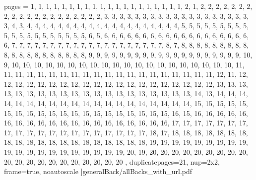 \documentclass[letterpaper]{article}
\begin{document}

	pages = 	{ %
											1,	1,	1,	1,	1,	1,	1,	1,	1,	1,	1,	1,	1,	1,	1,	1,	1,	1,	1,	1,
											2,	1,	
											2,	2,	2,	2,	2,	2,	2,	2,	2,	2,	2,	2,	2,	2,	2,	2,	2,	2,	2,	2,
											3,	3,	3,	3,	3,	3,	3,	3,	3,	3,	3,	3,	3,	3,	3,	3,	3,	3,	3,	3,
											4,	3,	
											4,	4,	4,	4,	4,	4,	4,	4,	4,	4,	4,	4,	4,	4,	4,	4,	4,	4,	4,	4,
											5,	5,	5,	5,	5,	5,	5,	5,	5,	5,	5,	5,	5,	5,	5,	5,	5,	5,	5,	5,
											6,	5,
											6,	6,	6,	6,	6,	6,	6,	6,	6,	6,	6,	6,	6,	6,	6,	6,	6,	6,	6,	6,
											7,	7,	7,	7,	7,	7,	7,	7,	7,	7,	7,	7,	7,	7,	7,	7,	7,	7,	7,	7,
											8,	7,	
											8,	8,	8,	8,	8,	8,	8,	8,	8,	8,	8,	8,	8,	8,	8,	8,	8,	8,	8,	8,
											9,	9,	9,	9,	9,	9,	9,	9,	9,	9,	9,	9,	9,	9,	9,	9,	9,	9,	9,	9,
											10, 9,
											10,	10,	10,	10,	10,	10,	10,	10,	10,	10,	10,	10,	10,	10,	10,	10,	10,	10,	10,	10,
											11,	11,	11,	11,	11,	11,	11,	11,	11,	11,	11,	11,	11,	11,	11,	11,	11,	11,	11,	11,
											12,	11,
											12,	12,	12,	12,	12,	12,	12,	12,	12,	12,	12,	12,	12,	12,	12,	12,	12,	12,	12,	12,
											13,	13,	13,	13,	13,	13,	13,	13,	13,	13,	13,	13,	13,	13,	13,	13,	13,	13,	13,	13,
											14, 	13,
											14,	14,	14,	14,	14,	14,	14,	14,	14,	14,	14,	14,	14,	14,	14,	14,	14,	14,	14,	14,
											15,	15,	15,	15,	15,	15,	15,	15,	15,	15,	15,	15,	15,	15,	15,	15,	15,	15,	15,	15,
											16,	15,
											16,	16,	16,	16,	16,	16,	16,	16,	16,	16,	16,	16,	16,	16,	16,	16,	16,	16,	16,	16,
											17,	17,	17,	17,	17,	17,	17,	17,	17,	17,	17,	17,	17,	17,	17,	17,	17,	17,	17,	17,
											18,	17,
											18,	18,	18,	18,	18,	18,	18,	18,	18,	18,	18,	18,	18,	18,	18,	18,	18,	18,	18,	18,
											19,	19,	19,	19,	19,	19,	19,	19,	19,	19,	19,	19,	19,	19,	19,	19,	19,	19,	19,	19,
											20,	19,
											20,	20,	20,	20,	20,	20,	20,	20,	20,	20,	20,	20,	20,	20,	20,	20,	20,	20,	20,	20
										},
						duplicatepages=21,
						nup=2x2,
						frame=true,
						noautoscale
					]{generalBack/allBacks_with_url.pdf}
\end{document}
